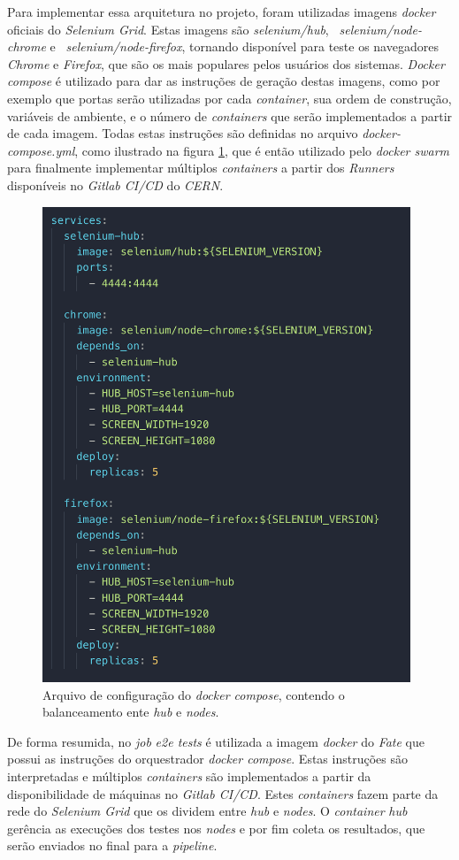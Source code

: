 Para implementar essa arquitetura no projeto, foram utilizadas imagens \emph{docker} oficiais do \emph{Selenium Grid}. Estas imagens são \emph{selenium/hub}, \emph{~selenium/node-chrome} e \emph{~selenium/node-firefox}, tornando disponível para teste os navegadores \emph{Chrome} e \emph{Firefox}, que são os mais populares pelos usuários dos sistemas. \emph{Docker compose} é utilizado para dar as instruções de geração destas imagens, como por exemplo que portas serão utilizadas por cada \emph{container}, sua ordem de construção, variáveis de ambiente, e o número de \emph{containers} que serão implementados a partir de cada imagem. Todas estas instruções são definidas no arquivo \emph{docker-compose.yml}, como ilustrado na figura \ref{fig:containers}, que é então utilizado pelo \emph{docker swarm} para finalmente implementar múltiplos \emph{containers} a partir dos \emph{Runners} disponíveis no \emph{Gitlab CI/CD} do \emph{CERN}.

\begin{figure}[H]
    \centering
    \includegraphics[width=11cm]{source/4-solucao/images/containers.png}
    \caption{Arquivo de configuração do \emph{docker compose}, contendo o balanceamento ente \emph{hub} e \emph{nodes}.}
    \label{fig:containers}
\end{figure}

De forma resumida, no \emph{job} \emph{e2e tests} é utilizada a imagem \emph{docker} do \emph{Fate} que possui as instruções do orquestrador \emph{docker compose}. Estas instruções são interpretadas e múltiplos \emph{containers} são implementados a partir da disponibilidade de máquinas no \emph{Gitlab CI/CD}. Estes \emph{containers} fazem parte da rede do \emph{Selenium Grid} que os dividem entre \emph{hub} e \emph{nodes}. O \emph{container} \emph{hub} gerência as execuções dos testes nos \emph{nodes} e por fim coleta os resultados, que serão enviados no final para a \emph{pipeline}.
